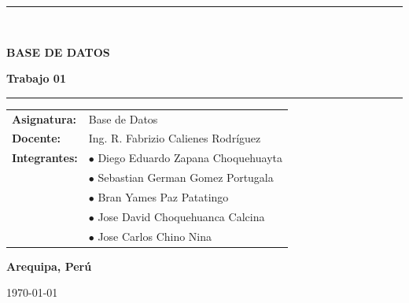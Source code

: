 \documentclass[12pt,a4paper]{article}
\begin{document}
\begin{titlepage}
\begin{minipage}{0.92\textwidth}
    \vspace{0.9cm}

    {\color{lasalleblue}\rule{\textwidth}{1.8pt}}\\[0.3cm]
    {\Large\bfseries\color{lasalledark} BASE DE DATOS\par}
    \vspace{0.3cm}
    {\large\bfseries\color{lasalleblue} Trabajo 01\par}
    \vspace{0.3cm}
    {\color{lasalleblue}\rule{\textwidth}{1.8pt}}

    \vspace{1.3cm}

    \begin{flushleft}
      \hspace*{0.5cm}
      \begin{tabular}{ll}
        \textbf{\color{lasalledark} Asignatura:} & Base de Datos \\[0.1cm]
        \textbf{\color{lasalledark} Docente:}    & Ing. R. Fabrizio Calienes Rodríguez \\[0.1cm]
        \textbf{\color{lasalledark} Integrantes:} & $\bullet$ Diego Eduardo Zapana Choquehuayta \\
                                                   & $\bullet$ Sebastian German Gomez Portugala \\
                                                   & $\bullet$ Bran Yames Paz Patatingo \\
                                                   & $\bullet$ Jose David Choquehuanca Calcina \\
                                                   & $\bullet$ Jose Carlos Chino Nina \\
      \end{tabular}
    \end{flushleft}

    \vfill

    \vspace{1.2cm}
    {\large\bfseries\color{lasalledark} Arequipa, Perú\par}
    \vspace{0.15cm}
    {\small\color{gray} \today\par}
  \end{minipage}
\end{titlepage}


\clearpage
\tableofcontents
\clearpage
\end{document}
